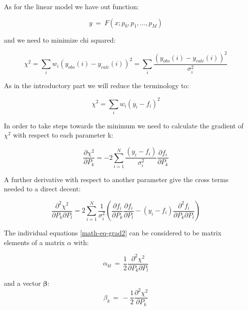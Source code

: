 As for the linear model we have out function:

\begin{equation}
  y ~=~ F(x; p_{0}, p_{1}, ..., p_{M})
\end{equation}

and we need to minimize chi squared:

\begin{equation}
  \chi^2 =  \sum_{i} w_{i} (y_{obs}(i) - y_{calc}(i))^2
  = \sum_{i} \frac{(y_{obs}(i) - y_{calc}(i))^2}{\sigma_{i}^{2}}
  \label{math-eq-nchi2}
\end{equation}

As in the introductory part we will reduce the terminology to:

\begin{equation}
  \chi^2 =  \sum_{i} w_{i} (y_{i} - f_{i})^2
  \label{math-eq-nchi2_a}
\end{equation}

In order to take steps towards the minimum we need to calculate the gradient of
$\chi^2$ with respect to each parameter k:

\begin{equation}
  \frac{\partial{\chi^2}}{\partial{P_{k}}} 
  =
  -2 \sum_{i=1}^{N}
  \frac{(y_{i} - f_{i})}{\sigma_{i}^{2}}
  \frac{\partial{f_{i}}}{\partial{P_{k}}}
\label{math-eq-grad}
\end{equation}

A further derivative with respect to another parameter give the cross terms 
needed to a direct decent:

\begin{equation}
  \frac{\partial^2{\chi^2}}{\partial{P_{k}}\partial{P_{l}}} 
  =
  2 \sum_{i=1}^{N} 
  \frac{1}{\sigma_{i}^2} \left (
  \frac{\partial{f_{i}}}{\partial{P_{k}}}
  \frac{\partial{f_{i}}}{\partial{P_{l}}}
  -
  \left (
  y_{i}-f_{i}
  \right )
  \frac{\partial^2{f_{i}}}{\partial{P_{k}}\partial{P_{l}}}
  \right )
\label{math-eq-grad2}
\end{equation}

The individual equations \ref{math-eq-grad2} can be considered to be matrix
elements of a matrix {\bf $\alpha$} with:

\begin{equation} 
  \alpha_{kl} \, = \, \frac{1}{2}
  \frac{\partial^2{\chi^2}}{\partial{P_{k}}\partial{P_{l}}}
  \label{math-eq-alpha}
\end{equation} 

and a vector $\mathbf \beta$:
\begin{equation} 
  \beta_{k} \, = \, -\frac{1}{2}
  \frac{\partial^2{\chi^2}}{\partial{P_{k}}}
  \label{math-eq-beta}
\end{equation}

